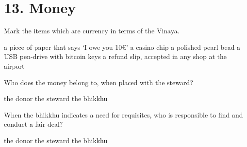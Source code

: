 \chapter{13. Money}
\renewcommand*{\theChapterTitle}{13. Money}

\begin{exam}{\autoExamName}

  \begin{problem}

    Mark the items which are currency in terms of the Vinaya.

    \bigskip

    \begin{manswers}{1}
      \bChoices
       a piece of paper that says `I owe you 10€'\eAns
       a casino chip\eAns
       a polished pearl bead\eAns
       a USB pen-drive with bitcoin keys\eAns
       a refund slip, accepted in any shop at the airport\eAns
      \eChoices
    \end{manswers}
    
  \end{problem}

  \problemDivide

  \begin{problem*}

    \begin{parts}

    \item Who does the money belong to, when placed with the steward?

      \bigskip

      \begin{answers}{3}
        \bChoices
         the donor\eAns
         the steward\eAns
         the bhikkhu\eAns
        \eChoices
      \end{answers}

      \bigskip

    \item When the bhikkhu indicates a need for requisites, who is responsible to find and conduct a fair deal?

      \bigskip

      \begin{answers}{3}
        \bChoices
         the donor\eAns
         the steward\eAns
         the bhikkhu\eAns
        \eChoices
      \end{answers}

    \end{parts}


\end{problem*}
\end{exam}
